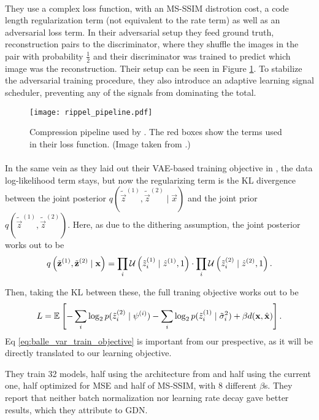 \paragraph{\cite{rippel2017real}} They use a complex loss function, with an MS-SSIM
distrotion cost, a code length regularization term (not equivalent to the rate
term) as well as an adversarial loss term. In their adversarial setup they feed
ground truth, reconstruction pairs to the discriminator, where they shuffle the
images in the pair with probability $\frac12$ and their discriminator was
trained to predict which image was the reconstruction. Their setup can be seen
in Figure \ref{fig:rippel_pipeline}. To stabilize the
adversarial training procedure, they also introduce an adaptive learning signal
scheduler, preventing any of the signals from dominating the total.
\begin{figure}
  \centering 
  \texttt{[image: rippel\_pipeline.pdf]}
  \caption{Compression pipeline used by \cite{rippel2017real}. The red boxes
    show the terms used in their loss function. (Image taken from \cite{rippel2017real}.)}
  \label{fig:rippel_pipeline}
\end{figure}

\paragraph{\cite{balle2018variational}} In the same vein as they laid out their
  VAE-based training objective in \cite{balle2016end}, the data log-likelihood
  term stays, but now the regularizing term is the KL divergence between the
  joint posterior $q(\tilde{\vec{z}}^{(1)}, \tilde{\vec{z}}^{(2)} \mid \vec{x})$
  and the joint prior 
  $q(\tilde{\vec{z}}^{(1)}, \tilde{\vec{z}}^{(2)})$. Here, as due to the
  dithering assumption, the joint posterior works out to be
  \[
    q\left(\tilde{\mathbf{z}}^{(1)}, \tilde{\mathbf{z}}^{(2)} \mid \mathbf{x}\right) =
    \prod_i \mathcal{U}\left( \tilde{z}^{(1)}_i \mid \hat{z}^{(1)}, 1 \right) \cdot
    \prod_i \mathcal{U}\left( \tilde{z}^{(2)}_i \mid \hat{z}^{(2)}, 1 \right).
  \]
  \par
  Then, taking the KL between these, the full traning objective works out to be
  \begin{equation}
    \label{eq:balle_var_train_objective}
    L = \mathbb{E}_{}\left[  -\sum_i \log_2 p(\tilde{z}^{(2)}_i \mid \psi^{(i)}) 
      -\sum_i \log_2 p(\tilde{z}^{(1)}_i \mid \tilde{\sigma}^2_i) +
      \beta d(\mathbf{x}, \hat{\mathbf{x}}) \right].
  \end{equation}
  Eq \ref{eq:balle_var_train_objective} is important from our prespective, as
  it will be
  directly translated to our learning objective.
  \par
  They train 32 models, half using the architecture from \cite{balle2016end} and
  half using the current one, half optimized for MSE and half of MS-SSIM, with 8
  different $\beta$s. They report that neither batch normalization nor learning
  rate decay gave better results, which they attribute to GDN.

